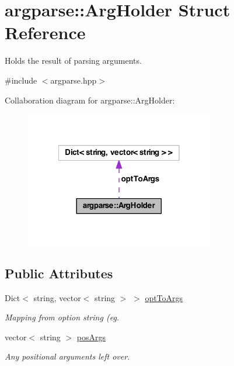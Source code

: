 \hypertarget{structargparse_1_1_arg_holder}{\section{argparse\-:\-:Arg\-Holder Struct Reference}
\label{structargparse_1_1_arg_holder}
}


Holds the result of parsing arguments.  




{\ttfamily \#include $<$argparse.\-hpp$>$}



Collaboration diagram for argparse\-:\-:Arg\-Holder\-:\nopagebreak
\begin{figure}[H]
\begin{center}
\leavevmode
\includegraphics[width=234pt]{structargparse_1_1_arg_holder__coll__graph}
\end{center}
\end{figure}
\subsection*{Public Attributes}
\begin{DoxyCompactItemize}
\item 
Dict$<$ string, vector$<$ string $>$ $>$ \hyperlink{structargparse_1_1_arg_holder_a930d6a9ba59a528783ea4df3410656ab}{opt\-To\-Args}
\begin{DoxyCompactList}\small\item\em Mapping from option string (eg. \end{DoxyCompactList}\item 
vector$<$ string $>$ \hyperlink{structargparse_1_1_arg_holder_a3154d09426a4270992d6b54cc1eb2927}{pos\-Args}
\begin{DoxyCompactList}\small\item\em Any positional arguments left over. \end{DoxyCompactList}\end{DoxyCompactItemize}


